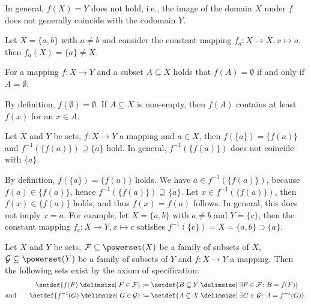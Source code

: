 \begin{remarks}
    \begin{remarkenumerate}
        \item In general, $f(X)=Y$ does not hold, i.e., the image of the domain $X$ under $f$ does not generally coincide with the codomain $Y$.
        \begin{miniproof} Let $X=\{a,b\}$ with $a\neq b$ and consider the constant mapping $f_a\colon X\rightarrow X,x\mapsto a$, then $f_a(X)=\{a\}\neq X$.
        \end{miniproof}
        \item\label{remark:mappings:image_non_empty} For a mapping $f\colon X\rightarrow Y$ and a subset $A\subseteq X$ holds that $f(A)=\emptyset$ if and only if $A=\emptyset$.
        \begin{miniproof}
            By definition, $f(\emptyset)=\emptyset$. If $A\subseteq X$ is non-empty, then $f(A)$ contains at least $f(x)$ for an $x\in A$.
        \end{miniproof}
        \item Let $X$ and $Y$ be sets, $f\colon X\to Y$ a mapping and $a\in X$, then $f(\{a\})=\{f(a)\}$ and $f^{-1}(\{f(a)\})\supseteq\{a\}$ hold. In general, $f^{-1}(\{f(a)\})$ does not coincide with $\{a\}$.
        \begin{miniproof}
            By definition, $f(\{a\})=\{f(a)\}$ holds. We have $a\in f^{-1}(\{f(a)\})$, because $f(a)\in\{f(a)\}$, hence $f^{-1}(\{f(a)\})\supseteq\{a\}$. Let $x\in f^{-1}(\{f(a)\})$, then $f(x)\in\{f(a)\}$ holds, and thus $f(x)=f(a)$ follows. In general, this does not imply $x=a$. For example, let $X=\{a,b\}$ with $a\neq b$ and $Y=\{c\}$, then the constant mapping $f_c\colon X\rightarrow Y,x\mapsto c$ satisfies $f^{-1}(\{c\})=X=\{a,b\}\supset \{a\}$.
        \end{miniproof}
        \item Let $X$ and $Y$ be sets, $\mathcal F\subseteq\powerset(X)$ be a family of subsets of $X$, $\mathcal G\subseteq\powerset(Y)$ be a family of subsets of $Y$ and $f\colon X\rightarrow Y$ a mapping. Then the following sets exist by the axiom of specification:
        \begin{align}\begin{split}
        \setdef{f(F)\given F\in\mathcal F}&\coloneq \setdef{B\subseteq Y\given \exists F\in\mathcal F\colon B=f(F)}\\
        \text{and}\qquad\setdef{f^{-1}(G)\given G\in\mathcal G}&\coloneq \setdef{A\subseteq X\given \exists G\in\mathcal G\colon A=f^{-1}(G)}.

\end{split}
\end{align}
\end{remarkenumerate}
\end{remarks}
